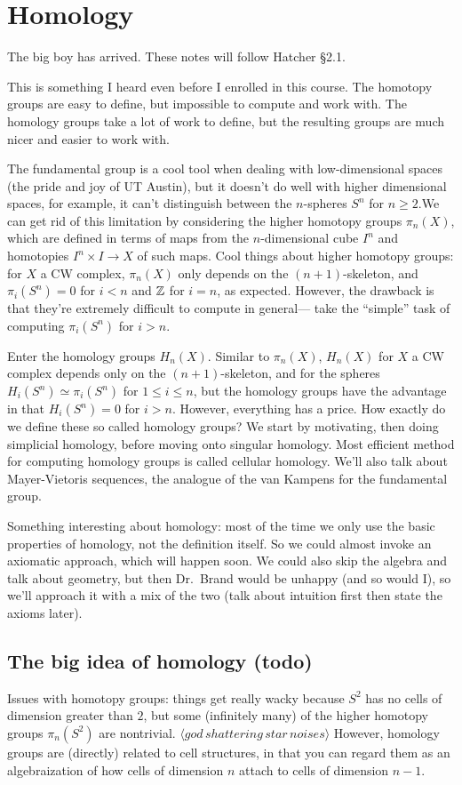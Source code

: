 \section{Homology} 
The big boy has arrived. These notes will follow Hatcher \S 2.1.
\begin{remark}
    This is something I heard even before I enrolled in this course. The homotopy groups are easy to define, but impossible to compute and work with. The homology groups take a lot of work to define, but the resulting groups are much nicer and easier to work with.
\end{remark}
\orbreak
The fundamental group is a cool tool when dealing with low-dimensional spaces (the pride and joy of UT Austin), but it doesn't do well with higher dimensional spaces, for example, it can't distinguish between the $n$-spheres $S^n$ for $n\geq 2$.We can get rid of this limitation by considering the higher homotopy groups $\pi_n(X)$, which are defined in terms of maps from the $n$-dimensional cube $I^n$ and homotopies $I^n \times  I \to X$ of such maps. Cool things about higher homotopy groups: for $X$ a CW complex, $\pi_n(X)$ only depends on the $(n+1)$-skeleton, and $\pi_i(S^n)=0$ for $i<n$ and $\mathbb{Z}$ for $i=n$, as expected. However, the drawback is that they're extremely difficult to compute in general— take the ``simple'' task of computing $\pi_i(S^n)$ for $i>n$.

Enter the homology groups $H_n(X)$. Similar to $\pi_n(X)$, $H_n(X)$ for $X$ a CW complex depends only on the $(n+1)$-skeleton, and for the spheres $H_i(S^n)\simeq \pi_i(S^n)$ for $1\leq i\leq n$, but the homology groups have the advantage in that $H_i(S^n)=0$ for $i>n$. However, everything has a price. How exactly do we define these so called homology groups? We start by motivating, then doing simplicial homology, before moving onto singular homology. Most efficient method for computing homology groups is called cellular homology. We'll also talk about Mayer-Vietoris sequences, the analogue of the van Kampens for the fundamental group.

Something interesting about homology: most of the time we only use the basic properties of homology, not the definition itself. So we could almost invoke an axiomatic approach, which will happen soon. We could also skip the algebra and talk about geometry, but then Dr.\ Brand would be unhappy (and so would I), so we'll approach it with a mix of the two (talk about intuition first then state the axioms later).
\subsection{The big idea of homology (todo)}
Issues with homotopy groups: things get really wacky because $S^{2} $ has no cells of dimension greater than $2$, but some (infinitely many) of the higher homotopy groups $\pi_n(S^{2} )$ are nontrivial. $\langle god\, shattering\, star\, noises\rangle $ However, homology groups are (directly) related to cell structures, in that you can regard them as an algebraization of how cells of dimension $n$ attach to cells of dimension $n-1$.

